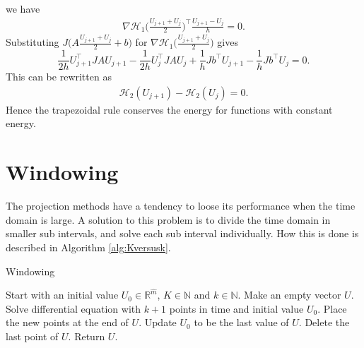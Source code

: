 \noindent we have
\begin{equation*}
\begin{aligned}
\nabla \mathcal{H}_1 \Big(\frac{U_{j+1}  + U_j}{2} \Big) ^\top \frac{U_{j+1} - U_j}{ h } = 0.
\end{aligned}
\end{equation*}
\noindent Substituting $ J \Big( A\frac{U_{j+1}  + U_j}{2}  + b \Big) $ for $\nabla \mathcal{H}_1 \Big( \frac{U_{j+1}  + U_j}{2} \Big)$ gives
\begin{equation*}
\frac{1}{2 h} U_{j+1}^\top JAU_{j+1} %
- \frac{1}{2 h} U_{j}^\top JAU_{j} + \frac{1}{h} Jb^\top U_{j+1} -\frac{1}{h} Jb^\top U_{j} = 0.
\end{equation*}
This can be rewritten as
\begin{equation*}
\begin{aligned}
\mathcal{H}_2(U_{j+1}) - \mathcal{H}_2(U_{j}) = 0.
\end{aligned}
\end{equation*}
\noindent Hence the trapezoidal rule conserves the energy for functions with constant energy. %

\section{Windowing}%
\noindent The projection methods have a tendency to loose its performance when the time domain is large. A solution to this problem is to divide the time domain in smaller sub intervals, and solve each sub interval individually. How this is done is described in Algorithm \ref{alg:Kversusk}.\\ 


\begin{algorithm} [h!]
\begin{algorithmic} \caption{ Windowing } \label{alg:Kversusk}  
\STATE Start with an initial value $U_0 \in \mathbb{R}^{\hat{m}}$, $K \in \mathbb{N}$ and $k \in \mathbb{N}$.
\STATE Make an empty vector $U$.
   \STATE Solve differential equation with $k+1$ points in time and initial value $U_0$.
   \STATE Place the new points at the end of $U$.
   \STATE Update $U_0$ to be the last value of $U$.
   \STATE Delete the last point of $U$.
\ENDFOR
\STATE Return $U$.
\end{algorithmic} 
\end{algorithm}

